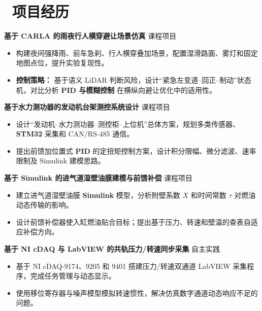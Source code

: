 \documentclass[11pt]{article}
\newlength{\interProjectSpacing}
\newcommand{\projectsep}{\vspace{\interProjectSpacing}}
\newlength{\intraProjectTitleSep}
\newcommand{\titlebreak}{\\[\intraProjectTitleSep]}
\newlength{\intraProjectListTopSep}
\begin{document}
\section{\makebox[\widthof{\faUsers}][c]{\color{CVBlue}\faUsers}\ 项目经历}


\textbf{基于 CARLA 的雨夜行人横穿避让场景仿真} \hfill 课程项目 \titlebreak
\begin{itemize}[nosep, topsep=\intraProjectListTopSep]
    \item 构建夜间强降雨、前车急刹、行人横穿叠加场景，配置湿滑路面、雾灯和固定地图点位，提升实验复现性。
    \item \textbf{控制策略：} 基于语义 LiDAR 判断风险，设计“紧急左变道--回正--制动”状态机，对比分析 \textbf{PID 与模糊控制} 在横纵向避让优化中的适用性。
\end{itemize}


\projectsep


\textbf{基于水力测功器的发动机台架测控系统设计} \hfill 课程项目 \titlebreak
\begin{itemize}[nosep, topsep=\intraProjectListTopSep]
    \item 设计“发动机--水力测功器--测控柜--上位机”总体方案，规划多类传感器、\textbf{STM32} 采集和 CAN/RS-485 通信。
    \item 提出前馈加位置式 \textbf{PID} 的定扭矩控制方案，设计积分限幅、微分滤波、速率限制及 Simulink 建模思路。
\end{itemize}


\projectsep


\textbf{基于 Simulink 的进气道湿壁油膜建模与前馈补偿} \hfill 课程项目 \titlebreak
\begin{itemize}[nosep, topsep=\intraProjectListTopSep]
    \item 建立进气道湿壁油膜 \textbf{Simulink} 模型，分析附壁系数 \(X\) 和时间常数 \(\tau\) 对燃油动态传输的影响。
    \item 设计前馈补偿器使入缸燃油贴合目标；提出基于压力、转速和壁温的查表自适应补偿方向。
\end{itemize}


\projectsep


\textbf{基于 NI cDAQ 与 LabVIEW 的共轨压力/转速同步采集} \hfill 自主实践 \titlebreak
\begin{itemize}[nosep, topsep=\intraProjectListTopSep]
    \item 基于 NI cDAQ-9174、9205 和 9401 搭建压力/转速双通道 LabVIEW 采集程序，完成任务管理与动态显示。
    \item 使用移位寄存器与噪声模型模拟转速惯性，解决仿真数字通道动态响应不足的问题。
\end{itemize}
\end{document}
